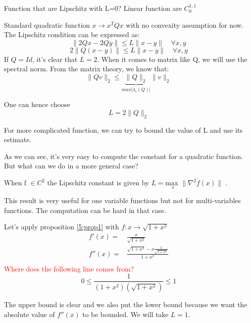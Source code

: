 \begin{example}\begin{leftbar}
Function that are Lipschitz with L=0? Linear function are $C_0^{1,1}$
\end{leftbar}\end{example}

\begin{example}\begin{leftbar}
Standard quadratic function $x \rightarrow x^T Q x $  with no convexity assumption for now. The Lipschitz condition can be expressed as: 
$$ \| 2Qx - 2Qy \| \leq L \| x-y \|  \quad \forall x,y$$
$$ 2 \| Q (x -y)  \| \leq L \| x-y \| \quad \forall x,y$$
If $Q=Id$, it's clear that $L = 2$.  When it comes to matrix like Q, we will use the spectral norm. From the matrix theory, we  know that:
$$ \| Qv \|_2 \leq \underbrace{\| Q\| _2}_{max \vert \lambda_i (Q) \vert} \| v \|_2$$

One can hence choose $$L=2 \| Q \|_2 $$

For more complicated function, we can try to bound the value of L  and use  its estimate. 
\end{leftbar}\end{example}

As we can see, it's very easy to compute the constant for a quadratic function. But what can we do in a more  general case?\\

\begin{property} 
When f  $ \in C^2$ the Lipschitz constant is given by $ L=\underset{x}{\text{max }} \| \nabla^2 f(x) \|$ .
\label{5:prop1}
\end{property}
This result is very useful for one variable functions but not for multi-variables functions. The computation can be hard in that case.

\begin{example}\begin{leftbar}
Let's apply proposition \ref{5:prop1} with $f: x \rightarrow \sqrt{1+x^2}$
\begin{eqnarray*}
f'(x)=& \frac{x}{\sqrt{1+x^2}}\\
f''(x)=& \frac{ \sqrt{1+x^2}-x \frac{x}{ \sqrt{1+x^2}}}{1+x^2}\\
\end{eqnarray*}  
\textcolor{red}{Where does the following line comes from?}
$$ 0 \leq \frac{1}{(1+x^2)(\sqrt{1+x^2})} \leq 1$$

The upper bound is clear and we also put the lower bound because we want the absolute value of $f''(x)$ to be bounded. We  will take $L=1$.
\end{leftbar}\end{example}

